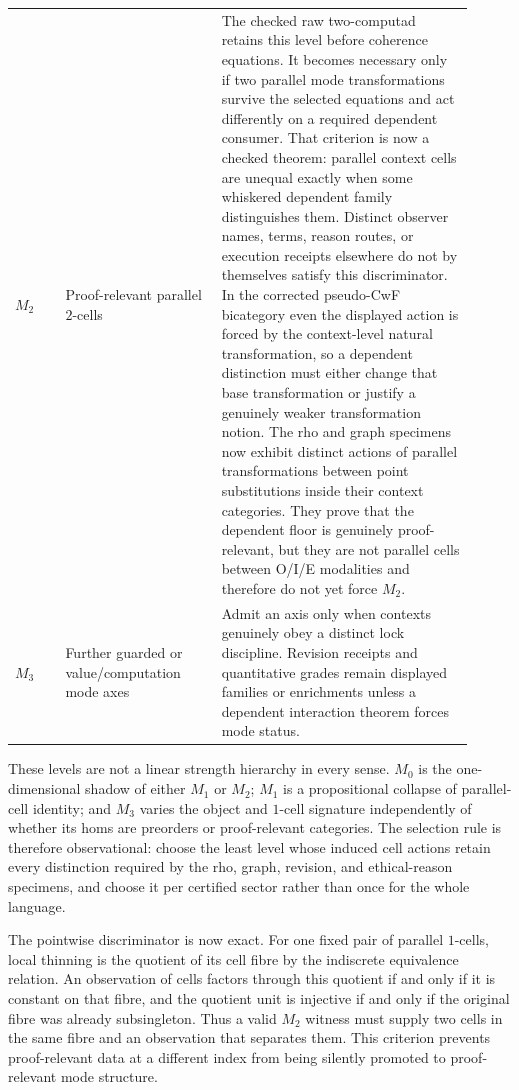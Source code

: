 \documentclass[11pt]{article}
\theoremstyle{definition}
\theoremstyle{remark}
\begin{document}
\begin{longtable}{>{\raggedright\arraybackslash}p{0.10\linewidth}%
                  >{\raggedright\arraybackslash}p{0.31\linewidth}%
                  >{\raggedright\arraybackslash}p{0.50\linewidth}}
$M_2$ & Proof-relevant parallel $2$-cells & The checked raw two-computad retains
  this level before coherence equations.  It becomes necessary only if two
  parallel mode transformations survive the selected equations and act
  differently on a required dependent consumer.  That criterion is now a
  checked theorem: parallel context cells are unequal exactly when some
  whiskered dependent family distinguishes them.  Distinct observer names,
  terms, reason routes, or execution receipts elsewhere do not by themselves
  satisfy this discriminator.  In the corrected pseudo-CwF bicategory even
  the displayed action is forced by the context-level natural transformation,
  so a dependent distinction must either change that base transformation or
  justify a genuinely weaker transformation notion.  The rho and graph
  specimens now exhibit distinct actions of parallel transformations between
  point substitutions inside their context categories.  They prove that the
  dependent floor is genuinely proof-relevant, but they are not parallel cells
  between O/I/E modalities and therefore do not yet force $M_2$. \\
$M_3$ & Further guarded or value/computation mode axes & Admit an axis only when
  contexts genuinely obey a distinct lock discipline.  Revision receipts and
  quantitative grades remain displayed families or enrichments unless a
  dependent interaction theorem forces mode status. \\
\bottomrule
\end{longtable}

These levels are not a linear strength hierarchy in every sense.  $M_0$ is the
one-dimensional shadow of either $M_1$ or $M_2$; $M_1$ is a propositional
collapse of parallel-cell identity; and $M_3$ varies the object and $1$-cell
signature independently of whether its homs are preorders or proof-relevant
categories.  The selection rule is therefore observational: choose the least
level whose induced cell actions retain every distinction required by the rho,
graph, revision, and ethical-reason specimens, and choose it per certified
sector rather than once for the whole language.

The pointwise discriminator is now exact.  For one fixed pair of parallel
$1$-cells, local thinning is the quotient of its cell fibre by the indiscrete
equivalence relation.  An observation of cells factors through this quotient
if and only if it is constant on that fibre, and the quotient unit is injective
if and only if the original fibre was already subsingleton.  Thus a valid
$M_2$ witness must supply two cells in the same fibre and an observation that
separates them.  This criterion prevents proof-relevant data at a different
index from being silently promoted to proof-relevant mode structure.
\end{document}

